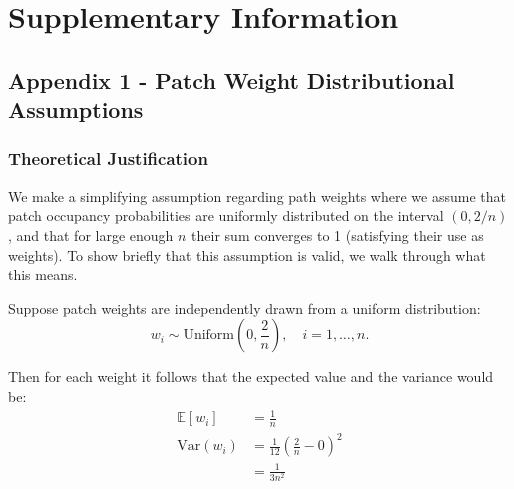 
\onecolumn %
\fancyhead{} %
\renewcommand{\floatpagefraction}{0.1}
\lfoot[\bSupInf]{\dAuthor}
\rfoot[\dAuthor]{\cSupInf}
\newpage

\captionsetup*{format=largeformat} %
\setcounter{figure}{0} %
\setcounter{equation}{0} %
\makeatletter 
\renewcommand{\thefigure}{S\@arabic\c@figure} %
\makeatother
\def\theequation{S\arabic{equation}}


\newpage
\section*{Supplementary Information}

\subsection*{Appendix 1 - Patch Weight Distributional Assumptions}\label{app:app-1}

\subsubsection*{Theoretical Justification}

We make a simplifying assumption regarding path weights where we assume that patch occupancy probabilities are uniformly distributed on the interval $(0,2/n)$, and that for large enough $n$ their sum converges to 1 (satisfying their use as weights). To show briefly that this assumption is valid, we walk through what this means. 

Suppose patch weights are independently drawn from a uniform distribution:
\begin{equation}
w_i \sim \text{Uniform}\left(0, \frac{2}{n}\right), \quad i = 1, \dots, n.
\end{equation}

Then for each weight it follows that the expected value and the variance would be:
\begin{align}
     \mathbb{E}[w_i] &=  \frac{1}{n}\\
     \text{Var}(w_i) &= \frac{1}{12} \left(\frac{2}{n} - 0\right)^2 \\
     &=  \frac{1}{3n^2}
\end{align}


